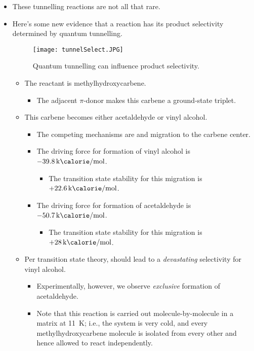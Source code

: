 \documentclass[../notes.tex]{subfiles}
\begin{document}
\begin{itemize}
\begin{itemize}
    \end{itemize}
    \item These tunnelling reactions are not all that rare.
    \item Here's some new evidence that a reaction has its product selectivity determined by quantum tunnelling.
    \begin{figure}[H]
        \centering
        \texttt{[image: tunnelSelect.JPG]}
        \caption{Quantum tunnelling can influence product selectivity.}
        \label{fig:tunnelSelect}
    \end{figure}
    \begin{itemize}
        \item The reactant is methylhydroxycarbene.
        \begin{itemize}
            \item The adjacent $\pi$-donor makes this carbene a ground-state triplet.
        \end{itemize}
        \item This carbene becomes either acetaldehyde or vinyl alcohol.
        \begin{itemize}
            \item The competing mechanisms are  and  migration to the carbene center.
            \item The driving force for formation of vinyl alcohol is $-\kcal{39.8}$.
            \begin{itemize}
                \item The transition state stability for this migration is $+\kcal{22.6}$.
            \end{itemize}
            \item The driving force for formation of acetaldehyde is $-\kcal{50.7}$.
            \begin{itemize}
                \item The transition state stability for this migration is $+\kcal{28}$.
            \end{itemize}
        \end{itemize}
        \item Per transition state theory,  should lead to a \emph{devastating} selectivity for vinyl alcohol.
        \begin{itemize}
            \item Experimentally, however, we observe \emph{exclusive} formation of acetaldehyde.
            \item Note that this reaction is carried out molecule-by-molecule in a matrix at \SI{11}{\kelvin}; i.e., the system is very cold, and every methylhydroxycarbene molecule is isolated from every other and hence allowed to react independently.

\end{itemize}
\end{itemize}
\end{itemize}
\end{document}
